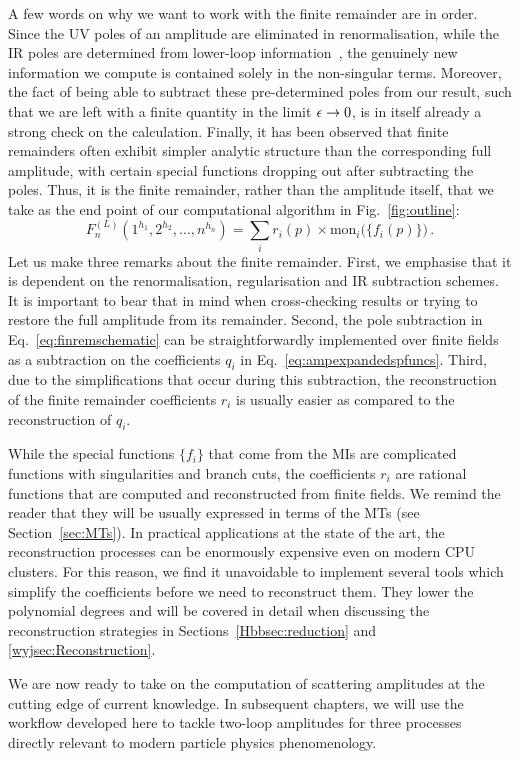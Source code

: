 \documentclass[main.tex]{subfiles}
\begin{document}
A few words on why we want to work with the finite remainder are in order. Since the UV poles of an amplitude are eliminated in renormalisation, while the IR poles are determined from lower-loop information~\cite{Catani:1998bh, Becher:2009cu, Becher:2009qa, Gardi:2009qi}, the genuinely new information we compute is contained solely in the non-singular terms. Moreover, the fact of being able to subtract these pre-determined poles from our result, such that we are left with a finite quantity in the limit $\epsilon \rightarrow 0$, is in itself already a strong check on the calculation. Finally, it has been observed that finite remainders often exhibit simpler analytic structure than the corresponding full amplitude, with certain special functions dropping out after subtracting the poles. Thus, it is the finite remainder, rather than the amplitude itself, that we take as the end point of our computational algorithm in Fig.~\ref{fig:outline}:
\begin{equation}
    F_n^{(L)} \left(1^{h_1}, 2^{h_2}, \ldots, n^{h_n} \right) = \sum_i r_i(p) \times \text{mon}_i \big(\{f_i(p)\}\big)\,.
\end{equation}
Let us make three remarks about the finite remainder. First, we emphasise that it is dependent on the renormalisation, regularisation and IR subtraction schemes. It is important to bear that in mind when cross-checking results or trying to restore the full amplitude from its remainder. Second, the pole subtraction in Eq.~\ref{eq:finremschematic} can be straightforwardly implemented over finite fields as a subtraction on the coefficients $q_i$ in Eq.~\ref{eq:ampexpandedspfuncs}. Third, due to the simplifications that occur during this subtraction, the reconstruction of the finite remainder coefficients $r_i$ is usually easier as compared to the reconstruction of $q_i$.

While the special functions $\{f_i\}$ that come from the MIs are complicated functions with singularities and branch cuts, the coefficients $r_i$ are rational functions that are computed and reconstructed from finite fields. We remind the reader that they will be usually expressed in terms of the MTs (see Section~\ref{sec:MTs}). In practical applications at the state of the art, the reconstruction processes can be enormously expensive even on modern CPU clusters. For this reason, we find it unavoidable to implement several tools which simplify the coefficients before we need to reconstruct them. They lower the polynomial degrees and will be covered in detail when discussing the reconstruction strategies in Sections~\ref{Hbbsec:reduction} and \ref{wyjsec:Reconstruction}.

We are now ready to take on the computation of scattering amplitudes at the cutting edge of current knowledge. In subsequent chapters, we will use the workflow developed here to tackle two-loop amplitudes for three processes directly relevant to modern particle physics phenomenology.
\end{document}
